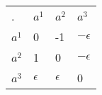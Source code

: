 \begin{center}
    \begin{tabular}{llll}
    .                         & $a^1$       & $a^2$       & $a^3$                             \\ \cline{2-4}
    \multicolumn{1}{l|}{$a^1$} & 0          & -1         & \multicolumn{1}{l|}{$-\epsilon$} \\
    \multicolumn{1}{l|}{$a^2$} & 1          & 0          & \multicolumn{1}{l|}{$-\epsilon$} \\
    \multicolumn{1}{l|}{$a^3$} & $\epsilon$ & $\epsilon$ & \multicolumn{1}{l|}{0}           \\ \cline{2-4}
    \end{tabular}
\end{center}